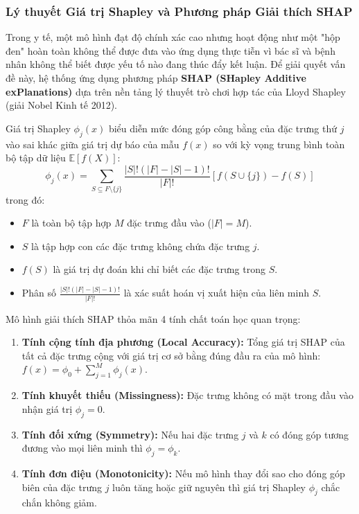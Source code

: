 \documentclass[12pt,a4paper]{article}
\begin{document}
\subsubsection{Lý thuyết Giá trị Shapley và Phương pháp Giải thích SHAP}
Trong y tế, một mô hình đạt độ chính xác cao nhưng hoạt động như một "hộp đen" hoàn toàn không thể được đưa vào ứng dụng thực tiễn vì bác sĩ và bệnh nhân không thể biết được yếu tố nào đang thúc đẩy kết luận. Để giải quyết vấn đề này, hệ thống ứng dụng phương pháp \textbf{SHAP (SHapley Additive exPlanations)} dựa trên nền tảng lý thuyết trò chơi hợp tác của Lloyd Shapley (giải Nobel Kinh tế 2012).

Giá trị Shapley $\phi_j(x)$ biểu diễn mức đóng góp công bằng của đặc trưng thứ $j$ vào sai khác giữa giá trị dự báo của mẫu $f(x)$ so với kỳ vọng trung bình toàn bộ tập dữ liệu $\mathbb{E}[f(X)]$:
\begin{equation}
    \phi_j(x) = \sum_{S \subseteq F \setminus \{j\}} \frac{|S|! (|F| - |S| - 1)!}{|F|!} \left[ f(S \cup \{j\}) - f(S) \right]
\end{equation}
trong đó:
\begin{itemize}[leftmargin=1.2cm]
    \item $F$ là toàn bộ tập hợp $M$ đặc trưng đầu vào ($|F| = M$).
    \item $S$ là tập hợp con các đặc trưng không chứa đặc trưng $j$.
    \item $f(S)$ là giá trị dự đoán khi chỉ biết các đặc trưng trong $S$.
    \item Phân số $\frac{|S|! (|F| - |S| - 1)!}{|F|!}$ là xác suất hoán vị xuất hiện của liên minh $S$.
\end{itemize}

Mô hình giải thích SHAP thỏa mãn 4 tính chất toán học quan trọng:
\begin{enumerate}[leftmargin=1.2cm]
    \item \textbf{Tính cộng tính địa phương (Local Accuracy):} Tổng giá trị SHAP của tất cả đặc trưng cộng với giá trị cơ sở bằng đúng đầu ra của mô hình: $f(x) = \phi_0 + \sum_{j=1}^M \phi_j(x)$.
    \item \textbf{Tính khuyết thiếu (Missingness):} Đặc trưng không có mặt trong đầu vào nhận giá trị $\phi_j = 0$.
    \item \textbf{Tính đối xứng (Symmetry):} Nếu hai đặc trưng $j$ và $k$ có đóng góp tương đương vào mọi liên minh thì $\phi_j = \phi_k$.
    \item \textbf{Tính đơn điệu (Monotonicity):} Nếu mô hình thay đổi sao cho đóng góp biên của đặc trưng $j$ luôn tăng hoặc giữ nguyên thì giá trị Shapley $\phi_j$ chắc chắn không giảm.
\end{enumerate}
\end{document}
